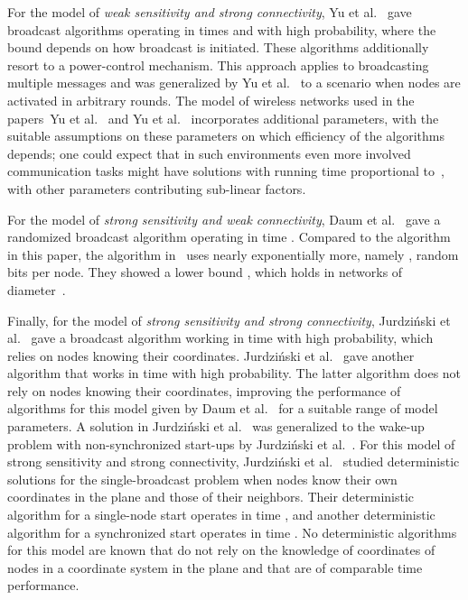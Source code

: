 \documentclass[11pt]{article}
\begin{document}
For the model of \emph{weak sensitivity and strong connectivity}, Yu et al.~\cite{YuHWTL-SIROCCO12} gave broadcast algorithms operating in times  and  with high probability, where the bound depends on how broadcast is initiated.
These algorithms additionally resort to a power-control mechanism.
This approach applies to broadcasting multiple messages and was generalized by Yu et al.~\cite{YuHWYL-INFOCOM13} to a scenario when nodes are activated in arbitrary rounds.
The model of wireless networks used in the papers~Yu et al.~\cite{YuHWTL-SIROCCO12} and Yu et al.~\cite{YuHWYL-INFOCOM13} incorporates additional parameters, with the suitable  assumptions on these parameters  on which efficiency of the algorithms depends;  one could expect that in such environments even more involved  communication tasks might have solutions with running time proportional to~, with other parameters contributing sub-linear factors.



For the model of \emph{strong sensitivity and weak connectivity}, Daum et al.~\cite{DGKN13} gave a randomized broadcast algorithm operating in time .
Compared to the algorithm in this paper, the algorithm in~\cite{DGKN13} uses nearly exponentially more, namely , random bits per node.
They showed a lower bound , which holds in networks of diameter~.


Finally, for the model of \emph{strong sensitivity and strong connectivity}, Jurdzi\'nski et al.~\cite{JKRS-DISC-13} gave a broadcast algorithm working in time  with high probability, which relies on nodes knowing their coordinates.
Jurdzi\'nski et al.~\cite{JurdzinskiKRS-PODC14} gave another algorithm that works in time  with high probability. 
The latter algorithm does not rely on nodes knowing their  coordinates, improving  the performance of algorithms for this model given by Daum et al.~\cite{DGKN13} for a suitable range of model parameters.
A solution in Jurdzi\'nski et al.~\cite{JurdzinskiKRS-PODC14} was  generalized to the wake-up problem with non-synchronized start-ups by Jurdzi\'nski et al.~\cite{JurdzinskiKRS-INFOCOM15}.
For this model of strong sensitivity and strong connectivity, Jurdzi\'nski et al.~\cite{JKS-FCT-13} studied deterministic solutions for the single-broadcast problem  when nodes know their own coordinates in the plane and those of their neighbors.
Their deterministic algorithm for a single-node start operates in  time , and another deterministic algorithm for a synchronized start operates in time .
No deterministic algorithms for this model  are known that do not rely on the knowledge of coordinates of nodes in a coordinate system in the plane and that are of comparable time performance.
\end{document}
